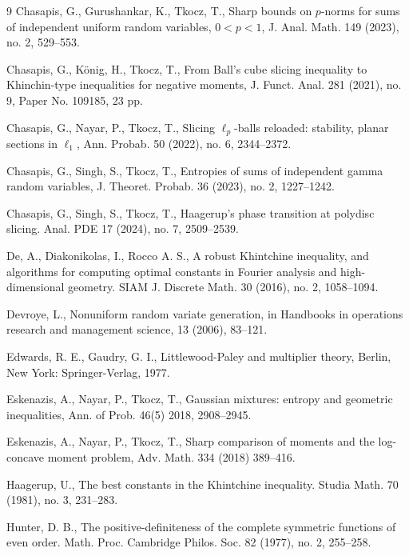 \documentclass[10pt]{article}
\newcommand{\1}{\textbf{1}}
\theoremstyle{remark}
\theoremstyle{definition}
\begin{document}
\begin{thebibliography}{9}
Chasapis, G., Gurushankar, K., Tkocz, T., Sharp bounds on $p$-norms for sums of independent uniform random variables, $0 < p < 1$, 
J. Anal. Math. 149 (2023), no. 2, 529--553. 


Chasapis, G., K\"onig, H., Tkocz, T.,
From Ball's cube slicing inequality to Khinchin-type inequalities for negative moments,
J. Funct. Anal. 281 (2021), no. 9, Paper No. 109185, 23 pp.


Chasapis, G., Nayar, P., Tkocz, T.,  Slicing $\ell_p$-balls reloaded: stability, planar sections in $\ell_1$, Ann. Probab. 50 (2022), no. 6, 2344--2372.


Chasapis, G., Singh, S., Tkocz, T.,
Entropies of sums of independent gamma random variables,  
J. Theoret. Probab. 36 (2023), no. 2, 1227--1242.


Chasapis, G., Singh, S., Tkocz, T.,
Haagerup's phase transition at polydisc slicing. Anal. PDE 17 (2024), no. 7, 2509–2539.

De, A., Diakonikolas, I., Rocco A. S.,
A robust Khintchine inequality, and algorithms for computing optimal constants in Fourier analysis and high-dimensional geometry. 
SIAM J. Discrete Math. 30 (2016), no. 2, 1058--1094. 



Devroye, L., Nonuniform random variate generation, in Handbooks in operations research and management science, 13 (2006), 83--121.





Edwards, R. E., Gaudry, G. I., 
Littlewood-Paley and multiplier theory, Berlin, New York: Springer-Verlag, 1977.


Eskenazis, A., Nayar, P., Tkocz, T., Gaussian mixtures: entropy and geometric inequalities, Ann. of Prob. 46(5) 2018, 2908--2945.



Eskenazis, A., Nayar, P., Tkocz, T.,
Sharp comparison of moments and the log-concave moment problem,
Adv. Math. 334 (2018) 389--416.



Haagerup, U.,
The best constants in the Khintchine inequality.
Studia Math. 70 (1981), no. 3, 231--283.

Hunter, D. B.,
The positive-definiteness of the complete symmetric functions of even order. 
Math. Proc. Cambridge Philos. Soc. 82 (1977), no. 2, 255--258.


\end{thebibliography}
\end{document}
